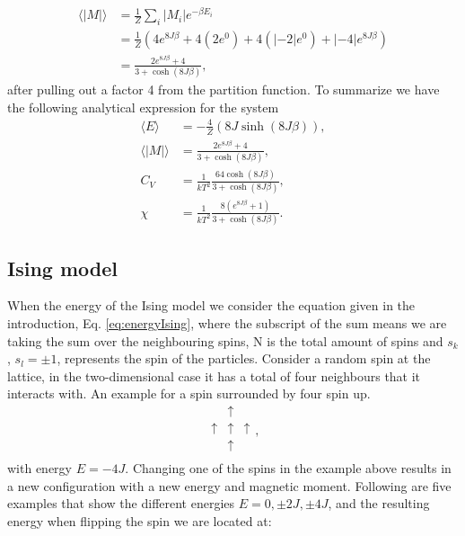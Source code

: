 \documentclass{emulateapj}
\begin{document}
\begin{align*}
    \langle |M| \rangle &= \frac{1}{Z} \sum_i |M_i| e^{-\beta E_i} \\
     &= \frac{1}{Z}\left(4e^{8J\beta} + 4\left(2e^{0}\right) + 4\left(|-2|e^0\right) + |-4|e^{8J\beta} \right) \\
     &= \frac{2e^{8J\beta} + 4}{3 + \cosh\left(8J\beta\right)},
\end{align*}
%
after pulling out a factor 4 from the partition function. To summarize we have the following analytical expression for the system
%
\begin{align*}
    \langle E \rangle &= -\frac{4}{Z}\left(8J\sinh\left(8J\beta\right)\right), \\
    \langle |M| \rangle &= \frac{2e^{8J\beta} + 4}{3 + \cosh\left(8J\beta\right)}, \\
    C_V &= \frac{1}{kT^2}\frac{64\cosh\left(8J\beta\right)}{ 3 + \cosh\left(8J\beta\right)}, \\
    \chi &= \frac{1}{kT^2}\frac{8\left(e^{8J\beta} + 1\right)}{3 + \cosh\left(8J\beta\right)}.
\end{align*}

\subsection{Ising model}
When the energy of the Ising model we consider the equation given in the introduction, Eq. \eqref{eq:energyIsing}, where the subscript of the sum means we are taking the sum over the neighbouring spins, N is the total amount of spins and $s_k$, $s_l = \pm 1$, represents the spin of the particles. Consider a random spin at the lattice, in the two-dimensional case it has a total of four neighbours that it interacts with.  An example for a spin surrounded by four spin up.
%
\begin{equation*}
    \begin{matrix}
    & \uparrow & \\
    \uparrow & \uparrow & \uparrow \\
    & \uparrow & \\
    \end{matrix},
\end{equation*}
%
with energy $E = -4J$. Changing one of the spins in the example above results in a new configuration with a new energy and magnetic moment. Following are five examples that show the different energies $E = 0, \pm 2J, \pm 4J$, and the resulting energy when flipping the spin we are located at:
\end{document}
